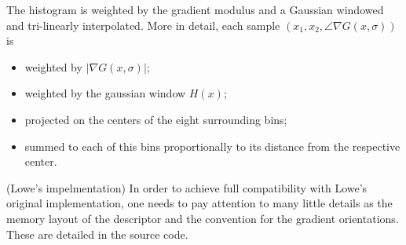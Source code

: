 \documentclass{article}
\begin{document}
\medskip
{} The histogram is weighted by the gradient modulus and a Gaussian windowed and tri-linearly interpolated. More in detail, each sample $(x_1,x_2,\angle\nabla G(x,\sigma))$ is
\begin{itemize}
\item weighted by $|\nabla G(x,\sigma)|$;
\item weighted by the gaussian window $H(x)$;
\item projected on the centers of the eight surrounding bins;
\item summed to each of this bins proportionally to its distance from the respective center.
\end{itemize}

\begin{remark}(Lowe's impelmentation)
In order to achieve full compatibility with Lowe's original implementation, one needs to pay attention to many little details as the memory layout of the descriptor and the convention for the gradient orientations. These are detailed in the source code.
\end{remark}
\end{document}
